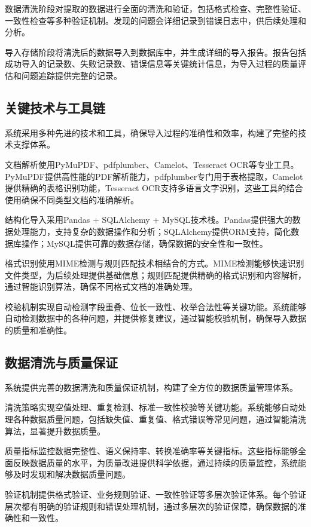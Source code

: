 数据清洗阶段对提取的数据进行全面的清洗和验证，包括格式检查、完整性验证、一致性检查等多种验证机制。发现的问题会详细记录到错误日志中，供后续处理和分析。

导入存储阶段将清洗后的数据导入到数据库中，并生成详细的导入报告。报告包括成功导入的记录数、失败记录数、错误信息等关键统计信息，为导入过程的质量评估和问题追踪提供完整的记录。

\subsection{关键技术与工具链}

系统采用多种先进的技术和工具，确保导入过程的准确性和效率，构建了完整的技术支撑体系。

文档解析使用PyMuPDF、pdfplumber、Camelot、Tesseract OCR等专业工具。PyMuPDF提供高性能的PDF解析能力，pdfplumber专门用于表格提取，Camelot提供精确的表格识别功能，Tesseract OCR支持多语言文字识别，这些工具的结合使用确保不同类型文档的准确解析。

结构化导入采用Pandas + SQLAlchemy + MySQL技术栈。Pandas提供强大的数据处理能力，支持复杂的数据操作和分析；SQLAlchemy提供ORM支持，简化数据库操作；MySQL提供可靠的数据存储，确保数据的安全性和一致性。

格式识别使用MIME检测与规则匹配技术相结合的方式。MIME检测能够快速识别文件类型，为后续处理提供基础信息；规则匹配提供精确的格式识别和内容解析，通过智能识别算法，确保不同格式文档的准确处理。

校验机制实现自动检测字段重叠、位长一致性、枚举合法性等关键功能。系统能够自动检测数据中的各种问题，并提供修复建议，通过智能校验机制，确保导入数据的质量和准确性。


\subsection{数据清洗与质量保证}

系统提供完善的数据清洗和质量保证机制，构建了全方位的数据质量管理体系。

清洗策略实现空值处理、重复检测、标准一致性校验等关键功能。系统能够自动处理各种数据质量问题，包括缺失值、重复值、格式错误等常见问题，通过智能清洗算法，显著提升数据质量。

质量指标监控数据完整性、语义保持率、转换准确率等关键指标。这些指标能够全面反映数据质量的水平，为质量改进提供科学依据，通过持续的质量监控，系统能够及时发现和解决数据质量问题。

验证机制提供格式验证、业务规则验证、一致性验证等多层次验证体系。每个验证层次都有明确的验证规则和错误处理机制，通过多层次的验证保障，确保数据的准确性和一致性。

